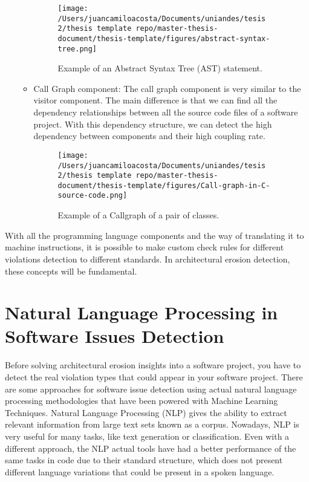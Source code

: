 \begin{itemize}
\begin{itemize}
\begin{figure}
    				\centering
    				\texttt{[image: /Users/juancamiloacosta/Documents/uniandes/tesis 2/thesis template repo/master-thesis-document/thesis-template/figures/abstract-syntax-tree.png]}
   				 \caption{Example of an Abstract Syntax Tree (AST) statement. \citet{abstract-syntax-tree} }
   				 \label{fig:ast}
			\end{figure}
			\item Call Graph component: The call graph component is very similar to the visitor component. The main difference is that we can find all the dependency relationships between all the source code files of a software project. With this dependency structure, we can detect the high dependency between components and their high coupling rate.
			\begin{figure}
    				\centering
    				\texttt{[image: /Users/juancamiloacosta/Documents/uniandes/tesis 2/thesis template repo/master-thesis-document/thesis-template/figures/Call-graph-in-C-source-code.png]}
   				 \caption{Example of a Callgraph of a pair of classes. \citet{callgraph} }
   				 \label{fig:ast}
			\end{figure}
		\end{itemize}
\end{itemize}

With all the programming language components and the way of translating it to machine instructions, it is possible to make custom check rules for different violations detection to different standards. In architectural erosion detection, these concepts will be fundamental.

\section{Natural Language Processing in Software Issues Detection}
Before solving architectural erosion insights into a software project, you have to detect the real violation types that could appear in your software project. There are some approaches for software issue detection using actual natural language processing methodologies that have been powered with Machine Learning Techniques. Natural Language Processing (NLP) gives the ability to extract relevant information from large text sets known as a corpus. Nowadays, NLP is very useful for many tasks, like text generation or classification. Even with a different approach, the NLP actual tools have had a better performance of the same tasks in code due to their standard structure, which does not present different language variations that could be present in a spoken language.

